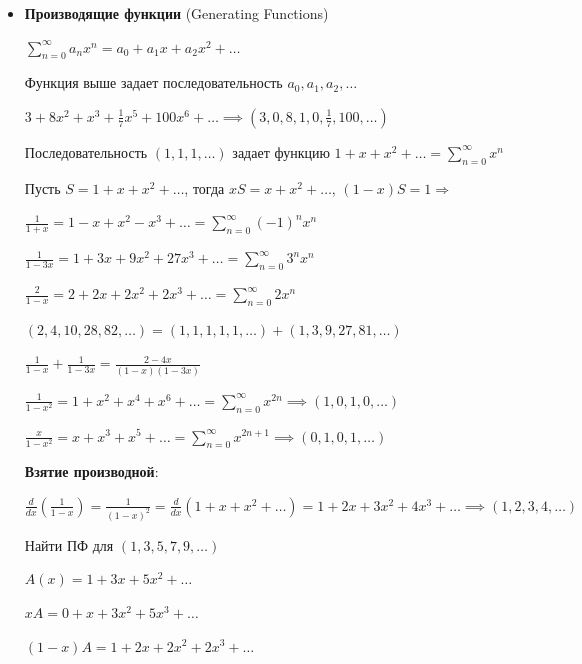 \documentclass[12pt]{article}
\begin{document}
    \begin{itemize}
        \item \textbf{Производящие функции} (Generating Functions)

        $\sum_{n = 0}^\infty a_n x^n = a_0 + a_1 x + a_2 x^2 + \dots$

        Функция выше задает последовательность $a_0, a_1, a_2, \dots$

        \Ex $3 + 8x^2 + x^3 + \frac{1}{7}x^5 + 100x^6 + \dots \implies (3, 0, 8, 1, 0, \frac{1}{7}, 100, \dots)$

        \Ex Последовательность $(1, 1, 1, \dots)$ задает функцию $1 + x + x^2 + \dots = \sum_{n = 0}^\infty x^n$

        Пусть $S = 1 + x + x^2 + \dots$, тогда $xS = x + x^2 + \dots$, $(1 - x) S = 1 \Longrightarrow $


        \Ex

        $\frac{1}{1 + x} = 1 - x + x^2 - x^3 + \dots = \sum_{n = 0}^\infty (-1)^n x^n$

        $\frac{1}{1 - 3x} = 1 + 3x + 9x^2 + 27x^3 + \dots = \sum_{n = 0}^\infty 3^n x^n$

        $\frac{2}{1 - x} = 2 + 2x + 2x^2 + 2x^3 + \dots = \sum_{n = 0}^\infty 2 x^n$

        $(2, 4, 10, 28, 82, \dots) = (1, 1, 1, 1, 1, \dots) + (1, 3, 9, 27, 81, \dots)$

        $\frac{1}{1 - x} + \frac{1}{1 - 3x} = \frac{2 - 4x}{(1 - x)(1 - 3x)}$

        $\frac{1}{1 - x^2} = 1 + x^2 + x^4 + x^6 + \dots = \sum_{n = 0}^\infty x^{2n} \implies (1, 0, 1, 0, \dots)$

        $\frac{x}{1 - x^2} = x + x^3 + x^5 + \dots = \sum_{n = 0}^\infty x^{2n + 1} \implies (0, 1, 0, 1, \dots)$

        \textbf{Взятие производной}:

        $\frac{d}{dx} (\frac{1}{1 - x}) = \frac{1}{(1 - x)^2} = \frac{d}{dx} (1 + x + x^2 + \dots) = 1 + 2x + 3x^2 + 4x^3 + \dots \implies (1, 2, 3, 4, \dots)$

        \Ex Найти ПФ для $(1, 3, 5, 7, 9, \dots)$

        $A(x) = 1 + 3x + 5x^2 + \dots$

        $xA = 0 + x + 3x^2 + 5x^3 + \dots$

        $(1 - x)A = 1 + 2x + 2x^2 + 2x^3 + \dots$


\end{itemize}
\end{document}
